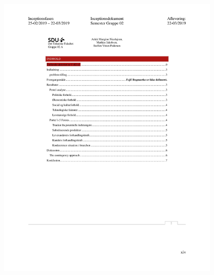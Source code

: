 \begin{figure}[hb]
  \includegraphics[scale = 0.33]{./PNG/Inceptions/Gruppe 02 + InceptionsDokument-47.jpg} 
\end{figure}

